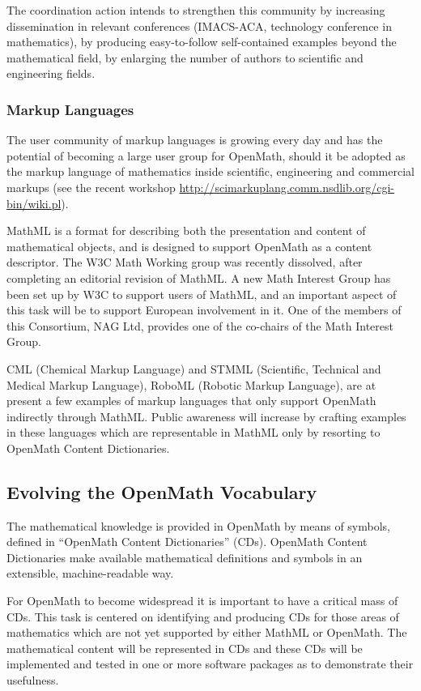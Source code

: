 \documentclass{euproposal}
\begin{document}
The coordination action intends to strengthen this community by
increasing dissemination in relevant conferences (IMACS-ACA,
technology conference in mathematics), by producing easy-to-follow
self-contained examples beyond the mathematical field, by enlarging
the number of authors to scientific and engineering fields.

\subsubsection{Markup Languages}\label{sec:ml}

The user community of markup languages is growing every day and has
the potential of becoming a large user group for OpenMath, should it
be adopted as the markup language of mathematics inside scientific,
engineering and commercial markups (see the recent workshop
\url{http://scimarkuplang.comm.nsdlib.org/cgi-bin/wiki.pl}).

MathML is a format for describing both the presentation and content of
mathematical objects, and is designed to support OpenMath as a content
descriptor.  The W3C Math Working group was recently dissolved, after
completing an editorial revision of MathML.  A new Math Interest Group
has been set up by W3C to support users of MathML, and an important
aspect of this task will be to support European involvement in it.
One of the members of this Consortium, NAG Ltd, provides one of the
co-chairs of the Math Interest Group.

CML (Chemical Markup Language) and STMML (Scientific, Technical and
Medical Markup Language), RoboML (Robotic Markup Language), are at
present a few examples of markup languages that only support OpenMath
indirectly through MathML.  Public awareness will increase by crafting
examples in these languages which are representable in MathML only by
resorting to OpenMath Content Dictionaries.

\subsection{Evolving the OpenMath Vocabulary}\label{sec:OCD}

The mathematical knowledge is provided in OpenMath by means of
symbols, defined in ``OpenMath Content Dictionaries'' (CDs).  OpenMath
Content Dictionaries make available mathematical definitions and
symbols in an extensible, machine-readable way.

For OpenMath to become widespread it is important to have a critical
mass of CDs. This task is centered on identifying and producing CDs
for those areas of mathematics which are not yet supported by either
MathML or OpenMath. The mathematical content will be represented in
CDs and these CDs will be implemented and tested in one or more
software packages as to demonstrate their usefulness.
\end{document}

